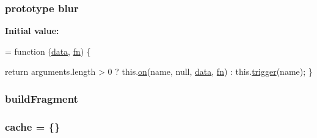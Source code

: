 \subsubsection[{\texorpdfstring{blur}{blur}}]{ {\bf prototype} blur}\hypertarget{jquery-2_82_81-vsdoc_8js_a13e7c39ee7152118878db346f297e09c}{}\label{jquery-2_82_81-vsdoc_8js_a13e7c39ee7152118878db346f297e09c}
{\bfseries Initial value\+:}
\begin{DoxyCode}
= \textcolor{keyword}{function} (\hyperlink{jquery-2_82_81-vsdoc_8js_a609407b3456fdc3c5671a9fc4a226ff7}{data}, \hyperlink{jquery-2_82_81-vsdoc_8js_acef6bdaf6b9b20fdcca1ea86f0902c3b}{fn}) \{
        

        \textcolor{keywordflow}{return} arguments.length > 0 ?
            this.\hyperlink{jquery-2_82_81-vsdoc_8js_ae453b412b883f60220d73468ef6c6dbc}{on}(name, null, \hyperlink{jquery-2_82_81-vsdoc_8js_a609407b3456fdc3c5671a9fc4a226ff7}{data}, \hyperlink{jquery-2_82_81-vsdoc_8js_acef6bdaf6b9b20fdcca1ea86f0902c3b}{fn}) :
            this.\hyperlink{jquery-2_82_81-vsdoc_8js_a2388c4114d5e3e4eab020f973641519c}{trigger}(name);
    \}
\end{DoxyCode}
\subsubsection[{\texorpdfstring{build\+Fragment}{buildFragment}}]{ build\+Fragment}\hypertarget{jquery-2_82_81-vsdoc_8js_a7166c09152b93f5b7ecfea8e7a61ba8c}{}\label{jquery-2_82_81-vsdoc_8js_a7166c09152b93f5b7ecfea8e7a61ba8c}
\subsubsection[{\texorpdfstring{cache}{cache}}]{ cache = \{\}}\hypertarget{jquery-2_82_81-vsdoc_8js_acdb445beb9aa4c6dbdf28258e18dbb58}{}\label{jquery-2_82_81-vsdoc_8js_acdb445beb9aa4c6dbdf28258e18dbb58}

